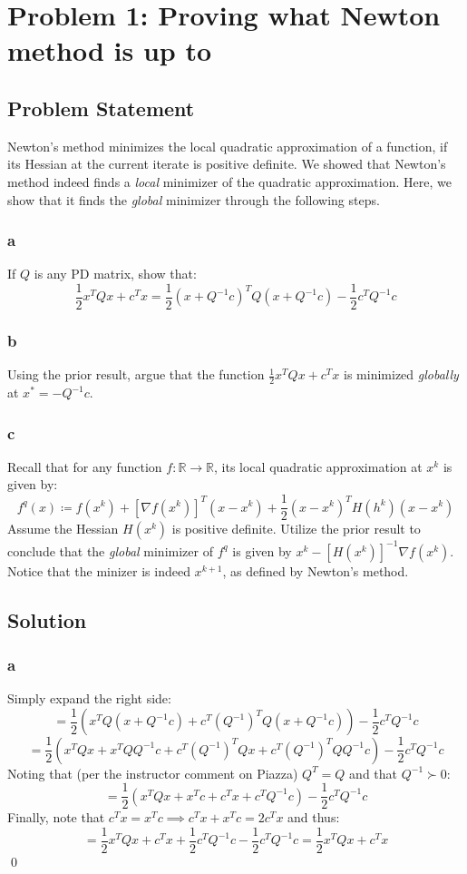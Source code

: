 \documentclass[11pt]{report}
\theoremstyle{definition}
\begin{document}
\section*{Problem 1: Proving what Newton method is up to}
\subsection*{Problem Statement}
Newton's method minimizes the local quadratic approximation of a function, if
its Hessian at the current iterate is positive definite. We showed that Newton's
method indeed finds a \textit{local} minimizer of the quadratic approximation.
Here, we show that it finds the \textit{global} minimizer through the following
steps.

\subsubsection*{a}
If $Q$ is any PD matrix, show that:
\[ \frac{1}{2}x^TQx+c^Tx =  \frac{1}{2}(x+Q^{-1}c)^TQ(x+Q^{-1}c)-\frac{1}{2}c^TQ^{-1}c \]

\subsubsection*{b}
Using the prior result, argue that the function $\frac{1}{2}x^TQx+c^Tx$ is
minimized \textit{globally} at $x^*=-Q^{-1}c$.

\subsubsection*{c}
Recall that for any function $f:\mathbb{R}\rightarrow\mathbb{R}$, its local quadratic
approximation at $x^k$ is given by:
\[
	f^{q}(x) \coloneqq
	f(x^k)+[\nabla f(x^k)]^T(x-x^k)+\frac{1}{2}(x-x^k)^TH(h^k)(x-x^k)
\]
Assume the Hessian $H(x^k)$ is positive definite. Utilize the prior result to
conclude that the \textit{global} minimizer of $f^q$ is given by
$x^k-[H(x^k)]^{-1}\nabla f(x^k)$. Notice that the minizer is indeed $x^{k+1}$,
as defined by Newton's method.


\subsection*{Solution}
\subsubsection*{a}
Simply expand the right side:
\[
	=\frac{1}{2}(x^TQ(x+Q^{-1}c)+c^T(Q^{-1})^TQ(x+Q^{-1}c))-\frac{1}{2}c^TQ^{-1}c
\]
\[
	=\frac{1}{2}(x^TQx+x^TQQ^{-1}c+c^T(Q^{-1})^TQx+c^T(Q^{-1})^TQQ^{-1}c)-\frac{1}{2}c^TQ^{-1}c
\]
Noting that (per the instructor comment on Piazza) $Q^T=Q$ and that $Q^{-1}\succ0$:
\[ =\frac{1}{2}(x^TQx+x^Tc+c^Tx+c^TQ^{-1}c)-\frac{1}{2}c^TQ^{-1}c \]
Finally, note that $c^Tx = x^Tc \implies c^Tx+x^Tc=2c^Tx$ and thus:
\[
	=\frac{1}{2}x^TQx+c^Tx+\frac{1}{2}c^TQ^{-1}c-\frac{1}{2}c^TQ^{-1}c
	=\frac{1}{2}x^TQx+c^Tx
\]
\qed
\end{document}
